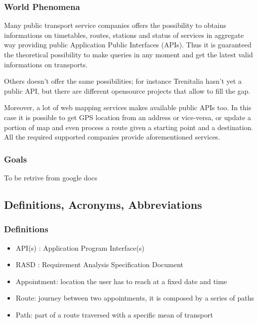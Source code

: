 \subsubsection{World Phenomena}

Many public transport service companies offers the possibility to obtains informations on timetables, routes, stations and status of services in aggregate way providing public Application Public Interfaces (APIs). Thus it is guaranteed the theoretical possibility to make queries in any moment and get the latest valid informations on transports.

Others doesn’t offer the same possibilities; for instance Trenitalia hasn’t yet a public API, but there are different opensource projects that allow to fill the gap.

Moreover, a lot of web mapping services makes available public APIs too. In this case it is possible to get GPS location from an address or vice-versa, or update a portion of map and even process a route given a starting point and a destination.
All the required supported companies provide aforementioned services.

\subsubsection{Goals}
{To be retrive from google docs}

\subsection{Definitions, Acronyms, Abbreviations}

\subsubsection{Definitions}
\begin{itemize}
	\item API(s) : Application Program Interface(s)
	\item RASD : Requirement Analysis Specification Document
	\item Appointment: location the user has to reach at a fixed date and time
	\item Route: journey between two appointments, it is composed by a series of paths
	\item Path: part of a route traversed with a specific mean of transport
\end{itemize}


